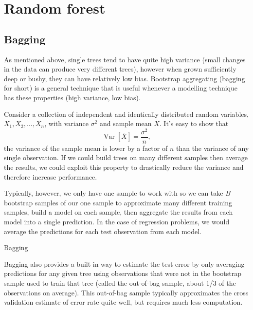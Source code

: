 \documentclass[12pt]{article}
\begin{document}


\section{Random forest} %
\label{sec:random_forest}

\subsection{Bagging} %
\label{sub:bagging}

As mentioned above, single trees tend to have quite high variance (small changes in the data can produce very different trees), however when grown sufficiently deep or bushy, they can have relatively low bias. Bootstrap aggregating (bagging for short) is a general technique that is useful whenever a modelling technique has these properties (high variance, low bias). 

Consider a collection of independent and identically distributed random variables, $X_{1}, X_{2}, \ldots, X_{n}$, with variance $\sigma^2$ and sample mean $\bar{X}$. It's easy to show that 
\begin{equation}
  \operatorname{Var}[\bar{X}] = \frac{\sigma^2}{n},
\end{equation}
the variance of the sample mean is lower by a factor of $n$ than the variance of any single observation. If we could build trees on many different samples then average the results, we could exploit this property to drastically reduce the variance and therefore increase performance.

Typically, however, we only have one sample to work with so we can take $B$ bootstrap samples of our one sample to approximate many different training samples, build a model on each sample, then aggregate the results from each model into a single prediction. In the case of regression problems, we would average the predictions for each test observation from each model. 

\begin{algorithm}[h]
 \caption{Bagging}
\end{algorithm}

Bagging also provides a built-in way to estimate the test error by only averaging predictions for any given tree using observations that were not in the bootstrap sample used to train that tree (called the out-of-bag sample, about 1/3 of the observations on average). This out-of-bag sample typically approximates the cross validation estimate of error rate quite well, but requires much less computation.
\end{document}

